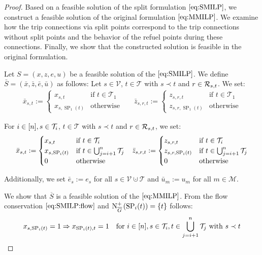 \begin{proof}

Based on a feasible solution of the split formulation $\eqref{eq:SMILP}$, we construct a feasible solution of the original formulation $\eqref{eq:MMILP}$. We examine how the trip connections via split points correspond to the trip connections without split points and the behavior of the refuel points during these connections. Finally, we show that the constructed solution is feasible in the original formulation.

Let ${S=(x,z,e,u)}$ be a feasible solution of the $\eqref{eq:SMILP}$. We define ${\bar{S}=\left(\bar{x},\bar{z},\bar{e},\bar{u}\right)}$ as follows: Let ${s\in\mathcal{V}}$, ${t\in\mathcal{T}}$ with ${s\prec t}$ and ${r\in\mathcal{R}_{s,t}}$. We set:
\begin{align*}
	\bar{x}_{s,t} := \begin{cases} x_{s,t} & \text{if } t\in\mathcal{T}_1 \\ x_{s,\operatorname{SP}_1(t)} & \text{otherwise} \end{cases} &&
	\bar{z}_{s,r,t} := \begin{cases} z_{s,r,t} & \text{if } t\in\mathcal{T}_1 \\ z_{s,r,\operatorname{SP}_1(t)} & \text{otherwise} \end{cases}
\end{align*}

For ${i\in[n]}, {s\in\mathcal{T}_i}$, ${t\in\mathcal{T}}$ with ${s\prec t}$ and ${r\in\mathcal{R}_{s,t}}$, we set:
\begin{align*}
	\bar{x}_{s,t} := \begin{cases} x_{s,t} & \text{if } t\in\mathcal{T}_i \\ x_{s,\operatorname{SP}_i(t)} & \text{if } t\in\bigcup_{j=i+1}^n \mathcal{T}_j \\ 0 & \text{otherwise} \end{cases} &&
	\bar{z}_{s,r,t} := \begin{cases} z_{s,r,t} & \text{if } t\in\mathcal{T}_i \\ z_{s,r,\operatorname{SP}_i(t)} & \text{if } t\in\bigcup_{j=i+1}^n \mathcal{T}_j \\ 0 & \text{otherwise} \end{cases}
\end{align*}

Additionally, we set ${\bar{e}_s := e_s}$ for all ${s\in\mathcal{V}\cupdot\mathcal{T}}$ and ${\bar{u}_m := u_m}$ for all ${m\in\mathcal{M}}$.

We show that $\overline{S}$ is a feasible solution of the $\eqref{eq:MMILP}$. From the flow conservation $\eqref{eq:SMILP:flow}$ and ${\operatorname{N}_{\overline{G}}^+\left(\operatorname{SP}_i(t)\right)=\{t\}}$ follows:
\begin{align*}
	x_{s,\operatorname{SP}_i(t)}=1 \Rightarrow x_{\operatorname{SP}_i(t),t}=1 && \text{for } i\in[n], s\in\mathcal{T}_i, t\in\bigcup_{j=i+1}^n \mathcal{T}_j \text{ with } s\prec t
\end{align*}


\end{proof}
